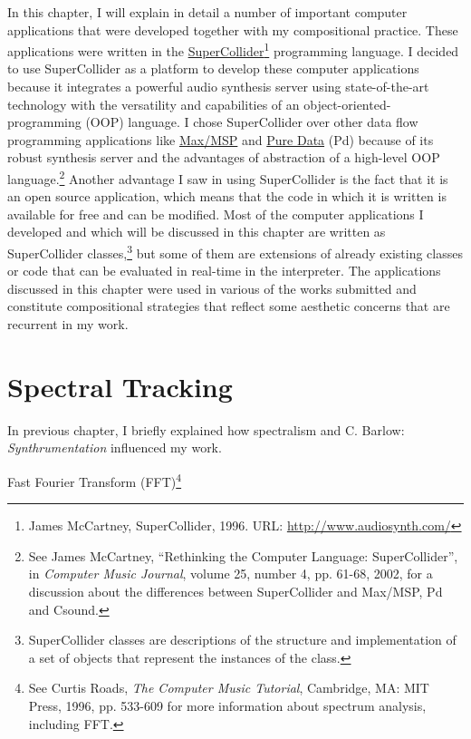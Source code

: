 In this chapter, I will explain in detail a number of important computer applications that were developed together with my compositional practice. These applications were written in the \href{http://supercollider.sourceforge.net/}{\mbox{SuperCollider}}\footnote{James McCartney, SuperCollider, 1996. URL: \href{http://www.audiosynth.com/}{http://www.audiosynth.com/}} programming language. I decided to use SuperCollider as a platform to develop these computer applications because it integrates a powerful audio synthesis server using state-of-the-art technology with the versatility and capabilities of an object-oriented-programming (OOP) language. I chose SuperCollider over other data flow programming applications like \href{http://www.cycling74.com/}{Max/MSP} and \href{http://puredata.info/}{Pure Data} (Pd) because of its robust synthesis server and the advantages of abstraction of a high-level OOP language.\footnote{See James McCartney, ``Rethinking the Computer Language: SuperCollider'', in \emph{Computer Music Journal}, volume 25, number 4, pp. 61-68, 2002, for a discussion about the differences between SuperCollider and Max/MSP, Pd and Csound.} Another advantage I saw in using SuperCollider is the fact that it is an open source application, which means that the code in which it is written is available for free and can be modified. Most of the computer applications I developed and which will be discussed in this chapter are written as SuperCollider classes,\footnote{SuperCollider classes are descriptions of the structure and implementation of a set of objects that represent the instances of the class.} but some of them are extensions of already existing classes or code that can be evaluated in real-time in the interpreter. The applications discussed in this chapter were used in various of the works submitted and constitute compositional strategies that reflect some aesthetic concerns that are recurrent in my work.

\section{Spectral Tracking}

In previous chapter, I briefly explained how spectralism and C. Barlow: \emph{Synthrumentation} influenced my work.

Fast Fourier Transform (FFT)\footnote{See Curtis Roads, \emph{The Computer Music Tutorial}, Cambridge, MA: MIT Press, 1996, pp. 533-609 for more information about spectrum analysis, including FFT.}


